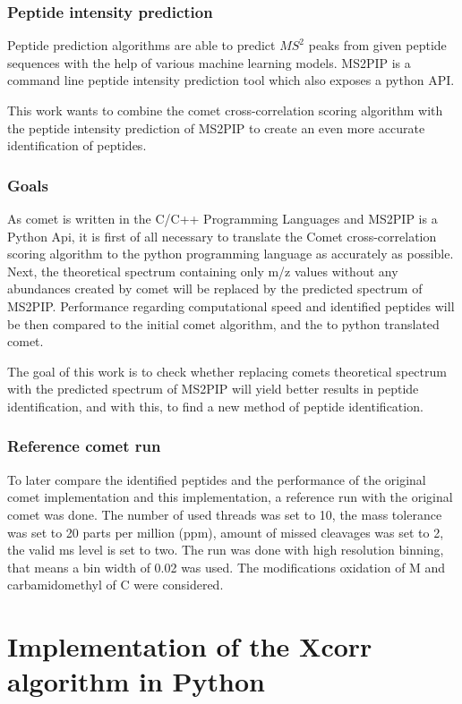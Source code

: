 \documentclass[11pt]{article}
\begin{document}
\subsubsection{Peptide intensity prediction}
Peptide prediction algorithms are able to predict \(MS^2\) peaks from given peptide sequences with the help of various machine learning models. MS2PIP\cite{ms2pip} is a command line peptide intensity prediction tool which also exposes a python API.

This work wants to combine the comet cross-correlation scoring algorithm
with the peptide intensity prediction of MS2PIP to create an even more accurate identification of peptides.

\subsubsection{Goals}
As comet is written in the C/C++ Programming Languages and MS2PIP is a Python Api, it is first of all necessary to translate the Comet cross-correlation scoring algorithm to the python programming language as accurately as possible. Next, the theoretical spectrum containing only m/z values without any abundances created by comet will be replaced by the predicted spectrum of MS2PIP. Performance regarding computational speed and identified peptides will be then compared to the initial comet algorithm, and the to python translated comet.

The goal of this work is to check whether replacing comets theoretical spectrum with the predicted spectrum of MS2PIP will yield better results in peptide identification, and with this, to find a new method of peptide identification.

\subsubsection{Reference comet run}
To later compare the identified peptides and the performance of the original comet implementation and this implementation, a reference run with the original comet was done. The number of used threads was set to 10, the mass tolerance was set to 20 parts per million (ppm), amount of missed cleavages was set to 2, the valid ms level is set to two. The run was done with high resolution binning, that means a bin width of 0.02 was used. The modifications oxidation of M and carbamidomethyl of C were considered.

\section{Implementation of the Xcorr algorithm in Python}
\end{document}
